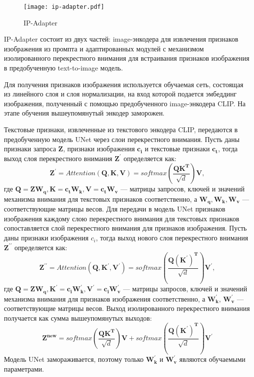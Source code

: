 \documentclass{article}
\begin{document}
\begin{figure}[H]
    \centering
    \texttt{[image: ip-adapter.pdf]}
    \caption{IP-Adapter}
    \label{fig:simple}
\end{figure}

IP-Adapter состоит из двух частей: image-энкодера для извлечения признаков изображения из промпта и адаптированных модулей с механизмом изолированного перекрестного внимания для встраивания признаков изображения в предобученную text-to-image модель.

Для получения признаков изображения используется обучаемая сеть, состоящая из линейного слоя и слоя нормализации, на вход которой подается эмбеддинг изображения, полученный с помощью предобученного image-энкодера CLIP. На этапе обучения вышеупомянутый энкодер заморожен.

Текстовые признаки, извлеченные из текстового энкодера CLIP, передаются в предобученную модель UNet через слои перекрестного внимания. Пусть даны признаки запроса $\mathbf{Z}$, признаки изображения $\mathbf{c_i}$ и текстовые признаки $\mathbf{c_t}$, тогда выход слоя перекрестного внимания $\mathbf{Z^{\prime}}$ определяется как: 
\begin{equation}
\mathbf{Z^{\prime}} = Attention(\mathbf{Q}, \mathbf{K}, \mathbf{V}) = softmax(\frac{\mathbf{QK^T}}{\sqrt{d}})\mathbf{V},
\end{equation}
где $\mathbf{Q} = \mathbf{ZW_q}, \mathbf{K} = \mathbf{c_t W_k}, \mathbf{V} = \mathbf{c_t W_v}$ --- матрицы запросов, ключей и значений механизма внимания для текстовых признаков соответственно, а $\mathbf{W_q, W_k, W_v}$ --- соответствующие матрицы весов. Для передачи в модель UNet признаков изображения каждому слою перекрестного внимания для текстовых признаков сопоставляется слой перекрестного внимания для признаков изображения. Пусть даны признаки изображения $c_i$, тогда выход нового слоя перекрестного внимания $\mathbf{Z^{\prime\prime}}$ определяется как: 
\begin{equation}
\mathbf{Z^{\prime\prime}} = Attention(\mathbf{Q, K^{\prime}, V^{\prime}}) = softmax(\frac{\mathbf{Q(K^{\prime})^T}}{\sqrt{d}})\mathbf{V^{\prime}},
\end{equation}
где $\mathbf{Q = Z W_q, K^{\prime} = c_i {W}^{\prime}_k, V^{\prime} = c_i {W}^{\prime}_v}$ --- матрицы запросов, ключей и значений механизма внимания для признаков изображения соответственно, а $\mathbf{{W}^{\prime}_k}$, $\mathbf{{W}^{\prime}_v}$ --- соответствующие матрицы весов. Выход изолированного перекрестного внимания получается как сумма вышеупомянутых выходов: 
\begin{equation}
\mathbf{Z^{new}} = softmax(\frac{\mathbf{QK^T}}{\sqrt{d}})\mathbf{V} +  softmax(\frac{\mathbf{Q(K^{\prime})^T}}{\sqrt{d}})\mathbf{V^{\prime}}
\end{equation}
Модель UNet замораживается, поэтому только $\mathbf{{W}^{\prime}_k}$ и $\mathbf{{W}^{\prime}_v}$ являются обучаемыми параметрами.
\end{document}
